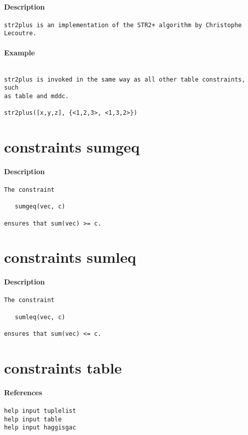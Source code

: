 \paragraph{Description}
{\footnotesize
\begin{verbatim}
str2plus is an implementation of the STR2+ algorithm by Christophe Lecoutre.
\end{verbatim}
}
\paragraph{Example}
{\footnotesize
\begin{verbatim}

str2plus is invoked in the same way as all other table constraints, such
as table and mddc.

str2plus([x,y,z], {<1,2,3>, <1,3,2>})
\end{verbatim}
}
\section{constraints sumgeq}
\paragraph{Description}
{\footnotesize
\begin{verbatim}
The constraint

   sumgeq(vec, c)

ensures that sum(vec) >= c.
\end{verbatim}
}
\section{constraints sumleq}
\paragraph{Description}
{\footnotesize
\begin{verbatim}
The constraint

   sumleq(vec, c)

ensures that sum(vec) <= c.
\end{verbatim}
}
\section{constraints table}
\paragraph{References}
{\footnotesize
\begin{verbatim}
help input tuplelist
help input table
help input haggisgac
\end{verbatim}
}
